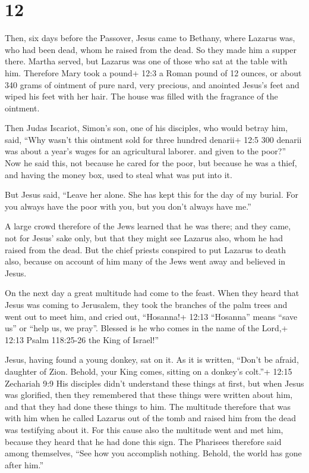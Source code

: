 \hypertarget{section-11}{%
\section{12}\label{section-11}}

 Then, six days before the Passover, Jesus came to Bethany,
where Lazarus was, who had been dead, whom he raised from the dead.
 So they made him a supper there. Martha served, but Lazarus
was one of those who sat at the table with him.  Therefore
Mary took a pound+ 12:3 a Roman pound of 12 ounces, or about 340 grams
of ointment of pure nard, very precious, and anointed Jesus's feet and
wiped his feet with her hair. The house was filled with the fragrance of
the ointment.

 Then Judas Iscariot, Simon's son, one of his disciples, who
would betray him, said,  ``Why wasn't this ointment sold for
three hundred denarii+ 12:5 300 denarii was about a year's wages for an
agricultural laborer. and given to the poor?''  Now he said
this, not because he cared for the poor, but because he was a thief, and
having the money box, used to steal what was put into it.

 But Jesus said, ``Leave her alone. She has kept this for
the day of my burial.  For you always have the poor with
you, but you don't always have me.''

 A large crowd therefore of the Jews learned that he was
there; and they came, not for Jesus' sake only, but that they might see
Lazarus also, whom he had raised from the dead.  But the
chief priests conspired to put Lazarus to death also, 
because on account of him many of the Jews went away and believed in
Jesus.

 On the next day a great multitude had come to the feast.
When they heard that Jesus was coming to Jerusalem,  they
took the branches of the palm trees and went out to meet him, and cried
out, ``Hosanna!+ 12:13 ``Hosanna'' means ``save us'' or ``help us, we
pray''. Blessed is he who comes in the name of the Lord,+ 12:13 Psalm
118:25-26 the King of Israel!''

 Jesus, having found a young donkey, sat on it. As it is
written,  ``Don't be afraid, daughter of Zion. Behold, your
King comes, sitting on a donkey's colt.''+ 12:15 Zechariah 9:9
 His disciples didn't understand these things at first, but
when Jesus was glorified, then they remembered that these things were
written about him, and that they had done these things to him.
 The multitude therefore that was with him when he called
Lazarus out of the tomb and raised him from the dead was testifying
about it.  For this cause also the multitude went and met
him, because they heard that he had done this sign.  The
Pharisees therefore said among themselves, ``See how you accomplish
nothing. Behold, the world has gone after him.''

